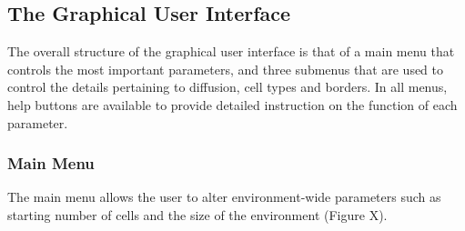 \documentclass[12pt]{article}
\begin{document}
\subsection{The Graphical User Interface}
The overall structure of the graphical user interface is that of a main 
menu that controls the most important parameters, and three submenus 
that are used to control the details pertaining to diffusion, cell types 
and borders. In all menus, help buttons are available to provide 
detailed instruction on the function of each parameter.

\subsubsection{Main Menu}
The main menu allows the user to alter environment-wide parameters such 
as starting number of cells and the size of the environment (Figure X). 
\end{document}
